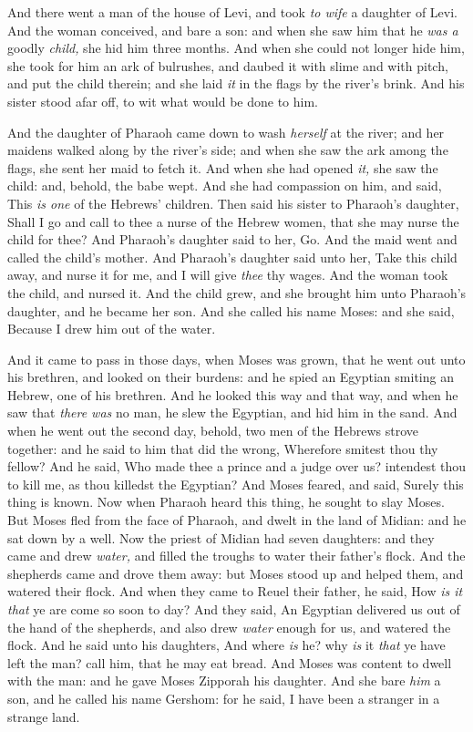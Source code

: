 \documentclass[11pt,letterpaper,oneside]{memoir}
\begin{document}
And there went a man of the house of Levi, and took \emph{to wife} a
daughter of Levi. And the woman conceived, and bare a son: and when she
saw him that he \emph{was a} goodly \emph{child,} she hid him three
months. And when she could not longer hide him, she took for him an ark
of bulrushes, and daubed it with slime and with pitch, and put the child
therein; and she laid \emph{it} in the flags by the river's brink. And
his sister stood afar off, to wit what would be done to him.

And the daughter of Pharaoh came down to wash \emph{herself} at the
river; and her maidens walked along by the river's side; and when she
saw the ark among the flags, she sent her maid to fetch it. And when she
had opened \emph{it,} she saw the child: and, behold, the babe wept. And
she had compassion on him, and said, This \emph{is one} of the Hebrews'
children. Then said his sister to Pharaoh's daughter, Shall I go and
call to thee a nurse of the Hebrew women, that she may nurse the child
for thee? And Pharaoh's daughter said to her, Go. And the maid went and
called the child's mother. And Pharaoh's daughter said unto her, Take
this child away, and nurse it for me, and I will give \emph{thee} thy
wages. And the woman took the child, and nursed it. And the child grew,
and she brought him unto Pharaoh's daughter, and he became her son. And
she called his name Moses: and she said, Because I drew him out of the
water.

And it came to pass in those days, when Moses was grown, that he went
out unto his brethren, and looked on their burdens: and he spied an
Egyptian smiting an Hebrew, one of his brethren. And he looked this way
and that way, and when he saw that \emph{there was} no man, he slew the
Egyptian, and hid him in the sand. And when he went out the second day,
behold, two men of the Hebrews strove together: and he said to him that
did the wrong, Wherefore smitest thou thy fellow? And he said, Who made
thee a prince and a judge over us? intendest thou to kill me, as thou
killedst the Egyptian? And Moses feared, and said, Surely this thing is
known. Now when Pharaoh heard this thing, he sought to slay Moses. But
Moses fled from the face of Pharaoh, and dwelt in the land of Midian:
and he sat down by a well. Now the priest of Midian had seven daughters:
and they came and drew \emph{water,} and filled the troughs to water
their father's flock. And the shepherds came and drove them away: but
Moses stood up and helped them, and watered their flock. And when they
came to Reuel their father, he said, How \emph{is it that} ye are come
so soon to day? And they said, An Egyptian delivered us out of the hand
of the shepherds, and also drew \emph{water} enough for us, and watered
the flock. And he said unto his daughters, And where \emph{is} he? why
\emph{is} it \emph{that} ye have left the man? call him, that he may eat
bread. And Moses was content to dwell with the man: and he gave Moses
Zipporah his daughter. And she bare \emph{him} a son, and he called his
name Gershom: for he said, I have been a stranger in a strange land.
\end{document}
